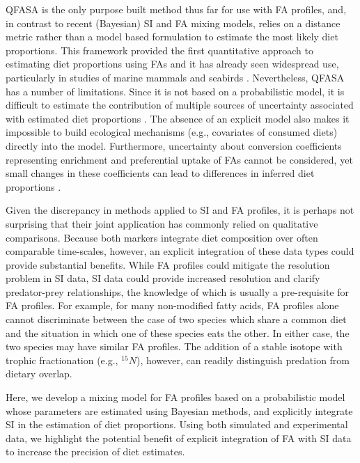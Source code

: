 \documentclass[fleqn,10pt]{wlpeerj}
\begin{document}
QFASA is the only purpose built method thus far for use with FA profiles, and, in
contrast to recent (Bayesian) SI and FA mixing models, relies on a distance
metric rather than a model based formulation to estimate the most
likely diet proportions. This framework provided the first
quantitative approach to estimating diet proportions using FAs
and it has already seen widespread use, particularly in studies of
marine mammals \citep{bowen_methods_2012} and seabirds
\citep{williams_using_2010}. Nevertheless, QFASA has a number of
limitations. Since it is not based on a probabilistic model, it is
difficult to estimate the contribution of multiple sources of uncertainty associated with estimated diet
proportions \citep[but see][for a treatment of confidence intervals in QFASA]{stewart2011managing, stewart2013zero}. The absence of an explicit model
also makes it impossible to build ecological mechanisms (e.g.,
covariates of consumed diets) directly into the model. Furthermore,
uncertainty about conversion coefficients representing enrichment and
preferential uptake of FAs cannot be considered, yet small
changes in these coefficients can lead to differences in inferred diet
proportions \citep{wang_validating_2010}.

Given the discrepancy in methods applied to SI and FA profiles, it is
perhaps not surprising that their joint application has commonly
relied on qualitative comparisons. Because both markers integrate diet
composition over often comparable time-scales, however, an explicit
integration of these data types could provide substantial
benefits. While FA profiles could mitigate the resolution problem in SI
data, SI data could provide increased resolution and clarify
predator-prey relationships, the knowledge of which is usually a
pre-requisite for FA profiles. For example, for many non-modified fatty
acids, FA profiles alone cannot discriminate between the case of two species
which share a common diet and the situation in which one of these
species eats the other.  In either case, the two species may have
similar FA profiles. The addition of a stable isotope with trophic
fractionation (e.g., $^{15}N$), however, can readily distinguish predation
from dietary overlap.

Here, we develop a mixing model for FA profiles based on a probabilistic
model whose parameters are estimated using Bayesian methods, and
explicitly integrate SI in the estimation of diet proportions. Using both simulated and experimental data, we
highlight the potential benefit of explicit integration of FA with SI data
to increase the precision of diet estimates.
\end{document}
